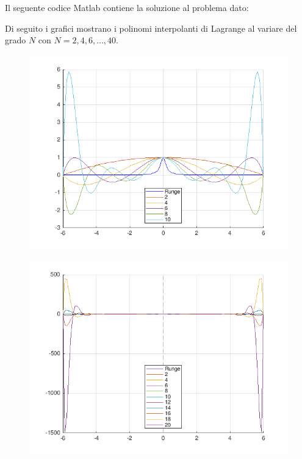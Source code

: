 \begin{center}
\large\noindent{}\end{center}

\noindent Il seguente codice Matlab contiene la soluzione al problema dato:



\pagebreak
\noindent Di seguito i grafici mostrano i polinomi interpolanti di Lagrange al variare del grado  $N$ con \(N = 2,4,6, \ldots,40\).

\begin{figure}[H]
	\includegraphics[height=0.6\textwidth,width=\textwidth]{Codici/Cap4/es9(n10)}
\end{figure}

\begin{figure}[H]
	\includegraphics[width=\textwidth]{Codici/Cap4/es9(n20)}
\end{figure}

